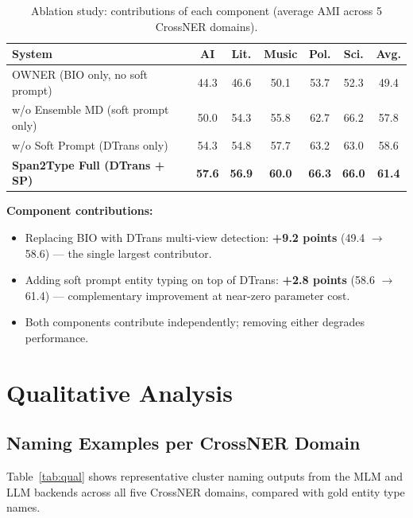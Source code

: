 \documentclass[11pt,a4paper]{article}
\begin{document}
\begin{table}[H]
\centering
\footnotesize
\caption{Ablation study: contributions of each component (average AMI across 5 CrossNER domains).}
\label{tab:ablation}
\begin{tabular}{l|c|c|c|c|c|c}
\toprule
\textbf{System} & \textbf{AI} & \textbf{Lit.} & \textbf{Music} & \textbf{Pol.} & \textbf{Sci.} & \textbf{Avg.} \\
\midrule
OWNER (BIO only, no soft prompt)       & 44.3 & 46.6 & 50.1 & 53.7 & 52.3 & 49.4 \\
w/o Ensemble MD (soft prompt only)     & 50.0 & 54.3 & 55.8 & 62.7 & 66.2 & 57.8 \\
w/o Soft Prompt (DTrans only)          & 54.3 & 54.8 & 57.7 & 63.2 & 63.0 & 58.6 \\
\textbf{Span2Type Full (DTrans + SP)}  & \textbf{57.6} & \textbf{56.9} & \textbf{60.0} & \textbf{66.3} & \textbf{66.0} & \textbf{61.4} \\
\bottomrule
\end{tabular}
\end{table}

\textbf{Component contributions:}
\begin{itemize}[noitemsep]
  \item Replacing BIO with DTrans multi-view detection: \textbf{+9.2 points} (49.4 $\to$ 58.6) — the single largest contributor.
  \item Adding soft prompt entity typing on top of DTrans: \textbf{+2.8 points} (58.6 $\to$ 61.4) — complementary improvement at near-zero parameter cost.
  \item Both components contribute independently; removing either degrades performance.
\end{itemize}

\section{Qualitative Analysis}

\subsection{Naming Examples per CrossNER Domain}

Table~\ref{tab:qual} shows representative cluster naming outputs from the MLM and LLM backends across all five CrossNER domains, compared with gold entity type names.
\end{document}
